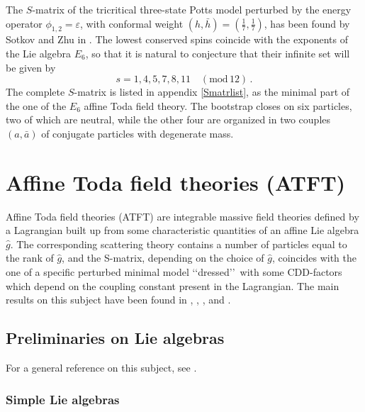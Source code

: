\documentclass[a4paper,12pt]{report}
\begin{document}
The $S$-matrix of the tricritical three-state Potts model perturbed by the energy operator
$\phi_{1,2}=\varepsilon$, with conformal weight $(h,\bar{h})=\left(\frac{1}{7},\frac{1}{7}\right)$, has been
found by Sotkov and Zhu in \cite{E6}. The lowest conserved spins coincide with the exponents of the Lie algebra
$E_{6}$, so that it is natural to conjecture that their infinite set will be given by
\begin{equation}
s=1,4,5,7,8,11 \quad (\textrm{mod}\, 12)\,.
\end{equation}
The complete $S$-matrix is listed in appendix \ref{Smatrlist}, as the minimal part of the one of the $E_{6}$
affine Toda field theory. The bootstrap closes on six particles, two of which are neutral, while the other four
are organized in two couples $(a,\bar{a})$ of conjugate particles with degenerate mass.




\vspace{1cm}

\section{Affine Toda field theories (ATFT)} \label{Toda}

Affine Toda field theories (ATFT) are integrable massive field theories defined by a Lagrangian built up from some
characteristic quantities of an affine Lie algebra $\hat{g}$. The corresponding scattering theory contains a
number of particles equal to the rank of $\hat{g}$, and the S-matrix, depending on the choice of $\hat{g}$,
coincides with the one of a specific perturbed minimal model \lq\lq dressed\rq\rq \, with some CDD-factors which
depend on the coupling constant present in the Lagrangian. The main results on this subject have been found in
\cite{arfatzam}, \cite{chrmuss1}, \cite{chrmuss2}, \cite{dur1} and \cite{dur2}.



\subsection{Preliminaries on Lie algebras}\label{prelLiealg}

For a general reference on this subject, see \cite{wyb}.

\subsubsection{Simple Lie algebras}
\end{document}
